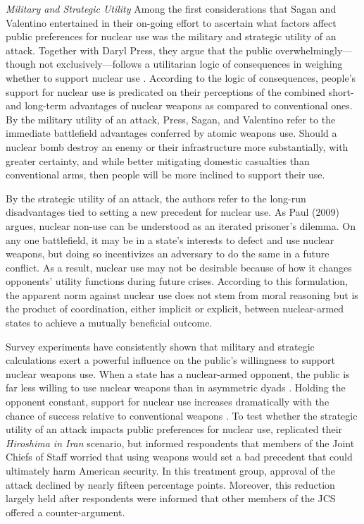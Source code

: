 \documentclass[12pt]{article}
\begin{document}
\textit{Military and Strategic Utility} Among the first considerations that Sagan and Valentino entertained in their on-going effort to ascertain what factors affect public preferences for nuclear use was the military and strategic utility of an attack. Together with Daryl Press, they argue that the public overwhelmingly—though not exclusively—follows a utilitarian logic of consequences in weighing whether to support nuclear use \citep{press_atomic_2013}. According to the logic of consequences, people's support for nuclear use is predicated on their perceptions of the combined short- and long-term advantages of nuclear weapons as compared to conventional ones. By the military utility of an attack, Press, Sagan, and Valentino refer to the immediate battlefield advantages conferred by atomic weapons use. Should a nuclear bomb destroy an enemy or their infrastructure more substantially, with greater certainty, and while better mitigating domestic casualties than conventional arms, then people will be more inclined to support their use.

By the strategic utility of an attack, the authors refer to the long-run disadvantages tied to setting a new precedent for nuclear use. As Paul (2009) argues, nuclear non-use can be understood as an iterated prisoner's dilemma. On any one battlefield, it may be in a state's interests to defect and use nuclear weapons, but doing so incentivizes an adversary to do the same in a future conflict. As a result, nuclear use may not be desirable because of how it changes opponents' utility functions during future crises. According to this formulation, the apparent norm against nuclear use does not stem from moral reasoning but is the product of coordination, either implicit or explicit, between nuclear-armed states to achieve a mutually beneficial outcome.

Survey experiments have consistently shown that military and strategic calculations exert a powerful influence on the public's willingness to support nuclear weapons use. When a state has a nuclear-armed opponent, the public is far less willing to use nuclear weapons than in asymmetric dyads \citep{haworth_what_2019,allison_under_2022, smetana_moscow_2022}. Holding the opponent constant, support for nuclear use increases dramatically with the chance of success relative to conventional weapons \citep{press_atomic_2013}. To test whether the strategic utility of an attack impacts public preferences for nuclear use, \citet{sagan_atomic_2024} replicated their\textit{ Hiroshima in Iran} scenario, but informed respondents that members of the Joint Chiefs of Staff worried that using weapons would set a bad precedent that could ultimately harm American security. In this treatment group, approval of the attack declined by nearly fifteen percentage points. Moreover, this reduction largely held after respondents were informed that other members of the JCS offered a counter-argument.
\end{document}
